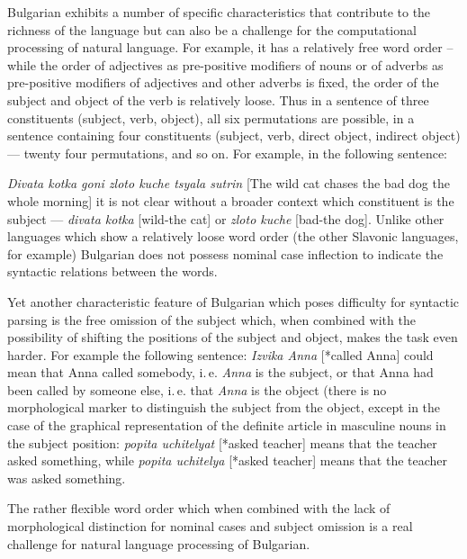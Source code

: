 \documentclass[]{../../metanetpaper}
\begin{document}
\begin{multicols}{2}

Bulgarian exhibits a number of specific characteristics that contribute to the richness of the language but can also be a challenge for the computational processing of natural language. For example, it has a relatively free word order – while the order of adjectives as pre-positive modifiers of nouns or of adverbs as pre-positive modifiers of adjectives and other adverbs is fixed, the order of the subject and object of the verb is relatively loose. Thus in a sentence of three constituents (subject, verb, object), all six permutations are possible, in a sentence containing four constituents (subject, verb, direct object, indirect object) — twenty four permutations, and so on. For example, in the following sentence:

 \textit{{Divata kotka goni zloto kuche tsyala sutrin}} [The wild cat chases the bad dog the whole morning] it is not clear without a broader context which constituent is the subject — \textit{{divata kotka}} [wild-the cat] or \textit{{zloto kuche}} [bad-the dog]. Unlike other languages which show a relatively loose word order (the other Slavonic languages, for example) Bulgarian does not possess nominal case inflection to indicate the syntactic relations between the words.

Yet another characteristic feature of Bulgarian which poses difficulty for syntactic parsing is the free omission of the subject which, when combined with the possibility of shifting the positions of the subject and object, makes the task even harder. For example the following sentence: \textit{{Izvika Anna}} [*called Anna] could mean that Anna called somebody, i.\,e.  \textit{Anna} is the subject, or that Anna had been called by someone else, i.\,e. that  \textit{Anna} is the object (there is no morphological marker to distinguish the subject from the object, except in the case of the graphical representation of the definite article in masculine nouns in the subject position: \textit{{popita uchitelyat}} [*asked teacher] means that the teacher asked something, while \textit{{popita uchitelya}} [*asked teacher] means that the teacher was asked something. 

The rather flexible word order which when combined with the lack of morphological distinction for nominal cases and subject omission is a real challenge for natural language processing of Bulgarian.


\end{multicols}
\end{document}
